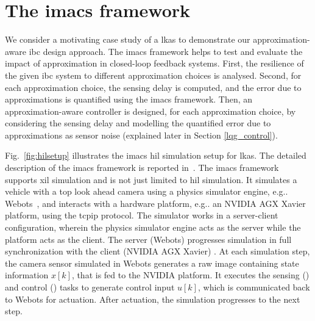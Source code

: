 \section{The \texorpdfstring{\Gls{imacs}}{IMACS} framework}\label{lkas_hil}
We consider a motivating case study of a \gls{lkas} to demonstrate our approximation-aware \gls{ibc} design approach.
The \gls{imacs} framework helps to test and evaluate the impact of approximation in closed-loop feedback systems.
First, the resilience of the given \gls{ibc} system to different approximation choices is analysed. Second, for each approximation choice, the sensing delay is computed, and the error due to approximations is quantified using the \gls{imacs} framework.
Then, an approximation-aware controller is designed, for each approximation choice, by considering the sensing delay and modelling the quantified error due to approximations as sensor noise (explained later in Section \ref{lqg_control}).

Fig.\ \ref{fig:hilsetup} illustrates the \gls{imacs} \gls{hil} simulation setup for \gls{lkas}. 
The detailed description of the \gls{imacs} framework is reported in~\cite{mohamed2019imacs}. The \gls{imacs} framework supports \gls{xil} simulation and is not just limited to \gls{hil} simulation.
It simulates a vehicle with a top look ahead camera using a physics simulator engine, e.g.. Webots~\cite{michel2004cyberbotics}, and interacts with a hardware platform, e.g.. an NVIDIA AGX Xavier platform, using the \gls{tcpip} protocol. The simulator works in a server-client configuration, wherein the physics simulator engine acts as the server while the platform acts as the client. The server (Webots) progresses simulation in full synchronization with the client (NVIDIA AGX Xavier) \cite{nvidiaAGX}. At each simulation step, the camera sensor simulated in Webots generates a raw image containing state information $x[k]$, that is fed to the NVIDIA platform. It executes the sensing (\taskS) and control (\taskC) tasks to generate control input $u[k]$, which is communicated back to Webots for actuation. After actuation, the simulation progresses to the next step. 

